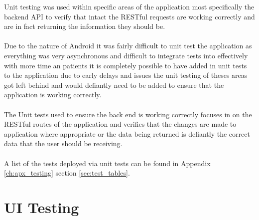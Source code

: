 Unit testing was used within specific areas of the application most specifically the backend API to verify that intact the RESTful requests are working correctly and are in fact returning the information they should be.\\
\\
Due to the nature of Android it was fairly difficult to unit test the application as everything was very asynchronous and difficult to integrate tests into effectively with more time an patients it is completely possible to have added in unit tests to the application due to early delays and issues the unit testing of theses areas got left behind and would defiantly need to be added to ensure that the application is working correctly.\\
\\
The Unit tests used to ensure the back end is working correctly focuses in on the RESTful routes of the application and verifies that the changes are made to application where appropriate or the data being returned is defiantly the correct data that the user should be receiving.\\
\\
A list of the tests deployed via unit tests can be found in Appendix \ref{ch:apx_testing} section \ref{sec:test_tables}.

\section{UI Testing}

